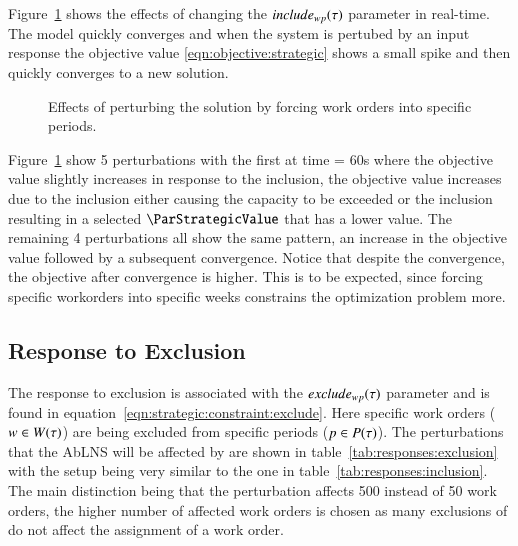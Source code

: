 Figure~\ref{fig:responses:inclusion} shows the effects of changing the $
include_{wp}(\tau)$ parameter in real-time. The model quickly
converges and when the system is pertubed by an input response the objective
value \ref{eqn:objective:strategic} shows a small spike and then quickly converges to a new solution. 

\begin{figure}[H]
	\centering
	\resizebox{10cm}{!}{
		
	}
	\caption{Effects of perturbing the solution by forcing work orders into specific periods.}
	\label{fig:responses:inclusion}
\end{figure}
Figure~\ref{fig:responses:inclusion} 
show 5 perturbations with the first at
time = 60s where the objective value  slightly increases in response to the
inclusion, the objective value increases due to the inclusion either causing
the capacity to be exceeded or the inclusion resulting in a selected $
\ParStrategicValue$ that has a lower value. The remaining 4 perturbations
all show the same  pattern, an increase in the objective value followed by a
subsequent convergence. Notice that despite the convergence, the objective after
convergence is higher. This is to be expected, since forcing specific 
workorders into specific weeks constrains the optimization problem more.

\subsection{Response to Exclusion}\label{sec:exclusion}
The response to exclusion is associated with the $exclude_{wp}(\tau)$
parameter and is found in equation~\ref{eqn:strategic:constraint:exclude}.
Here specific work orders ($w \in W(\tau)$) are
being excluded from specific periods ($p \in P(\tau)$).
The perturbations that the AbLNS will be affected by are shown in
table~\ref{tab:responses:exclusion}
with the setup being very similar to the
one in table~\ref{tab:responses:inclusion}.
The main distinction being that the perturbation affects 500 instead of 50 work orders, the higher number 
of affected work orders is chosen as many exclusions of do not affect the assignment of a work order.

